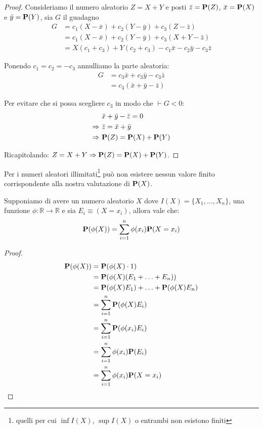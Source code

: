 \begin{proof}
  Consideriamo il numero aleatorio \( Z = X + Y \) e posti \( \bar{z} = \mathbf{P}(Z) \), \( \bar{x} = \mathbf{P}(X) \) e \( \bar{y} = \mathbf{P}(Y) \), sia \( G \) il guadagno
  \begin{align*}
    G &= c_1(X - \bar{x}) + c_2(Y - \bar{y}) + c_3(Z - \bar{z}) \\
    &= c_1(X - \bar{x}) + c_2(Y - \bar{y}) + c_3(X + Y - \bar{z}) \\
    &= X(c_1 + c_3) + Y(c_2 + c_3) - c_1\bar{x} - c_2\bar{y} - c_3\bar{z}
  \end{align*}

  Ponendo \( c_1 = c_2 = - c_3 \) annulliamo la parte aleatoria:
  \begin{align*}
    G &= c_3 \bar{x} + c_3 \bar{y} - c_3 \bar{z} \\
    &= c_3(\bar{x} + \bar{y} - \bar{z})
  \end{align*}

  Per evitare che si possa scegliere $c_3$ in modo che \( \vdash G < 0 \):
  \begin{align*}
    & \bar{x} + \bar{y} - \bar{z} = 0 \\
    \Rightarrow ~ & \bar{z} = \bar{x} + \bar{y} \\
    \Rightarrow ~ & \mathbf{P}(Z) = \mathbf{P}(X) + \mathbf{P}(Y)
  \end{align*}

  Ricapitolando: \( Z = X + Y \Rightarrow \mathbf{P}(Z) = \mathbf{P}(X) + \mathbf{P}(Y) \).
\end{proof}

Per i numeri aleatori illimitati\footnote{quelli per cui \( \inf I(X) \), \( \sup I(X) \) o entrambi non esistono finiti} può non esistere nessun valore finito corrispondente alla nostra valutazione di \( \mathbf{P}(X) \).

\begin{proposition}
  Supponiamo di avere un numero aleatorio $X$ dove \( I(X) = \{ X_1, \ldots, X_n \} \), una funzione \( \phi : \mathbb{R} \to \mathbb{R} \) e sia \( E_i \equiv (X = x_i) \), allora vale che:
  \[ \mathbf{P}(\phi(X)) = \sum_{i=1}^{n} \phi(x_i) \mathbf{P}(X = x_i) \]
\end{proposition}

\begin{proof}
  \begin{align*}
    \pr(\phi(X)) &= \pr(\phi(X) \cdot 1) \\
    &= \pr(\phi(X)(E_1 + \ldots + E_n)) \\
    &= \pr(\phi(X) E_1) + \ldots + \pr(\phi(X) E_n) \\
    &= \sum_{i=1}^{n} \pr(\phi(X) E_i) \\
    &= \sum_{i=1}^{n} \pr(\phi(x_i) E_i) \\ %
    &= \sum_{i=1}^{n} \phi(x_i) \pr(E_i) \\
    &= \sum_{i=1}^{n} \phi(x_i) \pr(X = x_i)
  \end{align*}
\end{proof}

